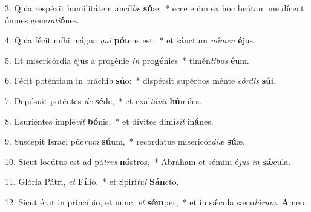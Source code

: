 \item 3. Quia respéxit humilitátem ancíl\textit{læ} \textbf{sú}æ:~* ecce enim ex hoc beátam me dícent ómnes gene\textit{rati}\textbf{ó}nes.

\item 4. Quia fécit míhi mágna \textit{qui} \textbf{pó}tens est:~* et sánctum \textit{nómen} \textbf{é}jus.

\item 5. Et misericórdia éjus a progénie \textit{in} pro\textbf{gé}nies~* timén\textit{tibus} \textbf{é}um.

\item 6. Fécit poténtiam in bráchi\textit{o} \textbf{sú}o:~* dispérsit supérbos ménte \textit{córdis} \textbf{sú}i.

\item 7. Depósuit poténtes \textit{de} \textbf{sé}de,~* et exal\textit{távit} \textbf{hú}miles.

\item 8. Esuriéntes implé\textit{vit} \textbf{bó}nis:~* et dívites dimí\textit{sit} in\textbf{á}nes.

\item 9. Suscépit Israel púe\textit{rum} \textbf{sú}um,~* recordátus misericór\textit{diæ} \textbf{sú}æ.

\item 10. Sicut locútus est ad pá\textit{tres} \textbf{nó}stros,~* Abraham et sémini é\textit{jus} \textit{in} \textbf{sǽ}cula.

\item 11. Glória Pátri, \textit{et} \textbf{Fí}lio,~* et Spirí\textit{tui} \textbf{Sán}cto.

\item 12. Sicut érat in princípio, et nunc, \textit{et} \textbf{sém}per,~* et in sǽcula sæcu\textit{lórum.} \textbf{A}men.